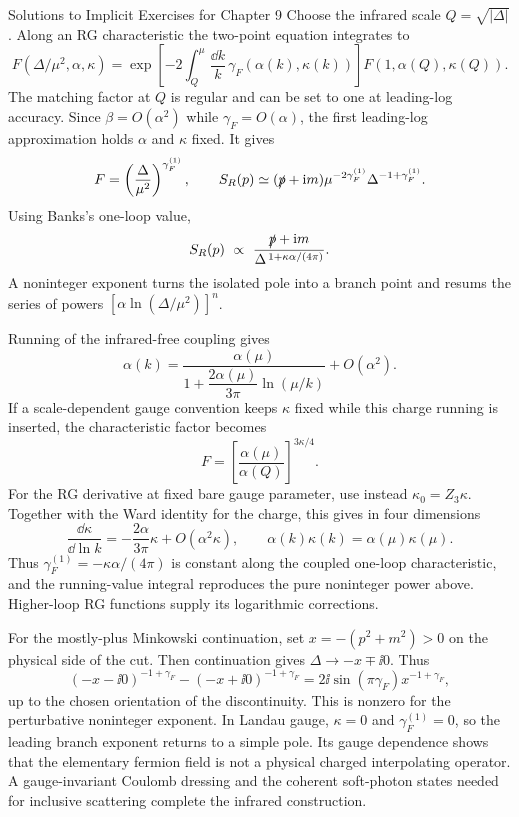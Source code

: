 \begin{bankssolutions}{Solutions to Implicit Exercises for Chapter 9}
Choose the infrared scale $Q=\sqrt{|\Delta|}$.  Along an RG characteristic the
two-point equation integrates to
\[
  F(\Delta/\mu^2,\alpha,\kappa)=
  \exp\!\left[-2\int_Q^\mu\frac{\dd k}{k}\,
  \gamma_F(\alpha(k),\kappa(k))\right]F(1,\alpha(Q),\kappa(Q)).
\]
The matching factor at $Q$ is regular and can be set to one at leading-log
accuracy.  Since $\beta=O(\alpha^2)$ while $\gamma_F=O(\alpha)$, the first
leading-log approximation holds $\alpha$ and $\kappa$ fixed.  It gives
\[
  F=\left(\frac{\Delta}{\mu^2}\right)^{\gamma_F^{(1)}},
  \qquad
  S_R(p)\simeq
  (\slashed p+\mathrm{i} m)\mu^{-2\gamma_F^{(1)}}
  \Delta^{-1+\gamma_F^{(1)}}.
\]
Using Banks's one-loop value,
\[
  S_R(p)\ \propto\
  \frac{\slashed p+\mathrm{i} m}
  {\Delta^{\,1+\kappa\alpha/(4\pi)}}.
\]
A noninteger exponent turns the isolated pole into a branch point and resums
the series of powers $[\alpha\ln(\Delta/\mu^2)]^n$.

Running of the infrared-free coupling gives
\[
  \alpha(k)=\frac{\alpha(\mu)}
  {1+\dfrac{2\alpha(\mu)}{3\pi}\ln(\mu/k)}
  +O(\alpha^2).
\]
If a scale-dependent gauge convention keeps $\kappa$ fixed while this charge
running is inserted, the characteristic factor becomes
\[
  F=\left[\frac{\alpha(\mu)}{\alpha(Q)}\right]^{3\kappa/4}.
\]
For the RG derivative at fixed bare gauge parameter, use instead
$\kappa_0=Z_3\kappa$.  Together with the Ward identity for the charge, this
gives in four dimensions
\[
  \frac{\dd\kappa}{\dd\ln k}
  =-\frac{2\alpha}{3\pi}\kappa+O(\alpha^2\kappa),
  \qquad
  \alpha(k)\kappa(k)=\alpha(\mu)\kappa(\mu).
\]
Thus $\gamma_F^{(1)}=-\kappa\alpha/(4\pi)$ is constant along the coupled
one-loop characteristic, and the running-value integral reproduces the pure
noninteger power above.  Higher-loop RG functions supply its logarithmic
corrections.

For the mostly-plus Minkowski continuation, set
$x=-(p^2+m^2)>0$ on the physical side of the cut.  Then
continuation gives
$\Delta\to-x\mp\ii0$.  Thus
\[
  (-x-\ii0)^{-1+\gamma_F}
  -(-x+\ii0)^{-1+\gamma_F}
  =2\ii\sin(\pi\gamma_F)x^{-1+\gamma_F},
\]
up to the chosen orientation of the discontinuity.  This is nonzero for the
perturbative noninteger exponent.  In Landau gauge, $\kappa=0$ and
$\gamma_F^{(1)}=0$, so the leading branch exponent returns to a simple pole.
Its gauge dependence shows that the elementary fermion field is not a
physical charged interpolating operator.  A gauge-invariant Coulomb dressing
and the coherent soft-photon states needed for inclusive scattering complete
the infrared construction.


\end{bankssolutions}
